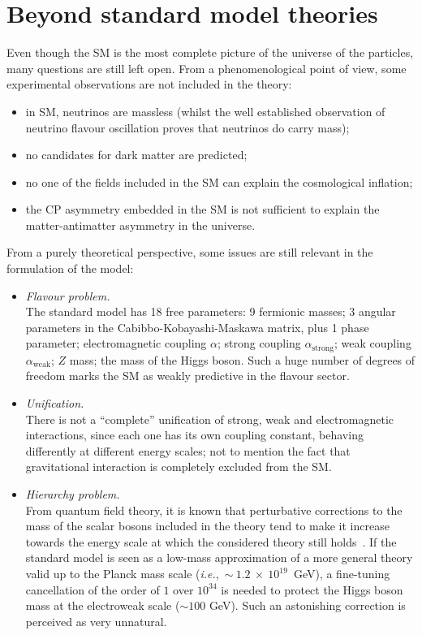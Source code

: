 \section{Beyond standard model theories}
Even though the SM is the most complete picture of the universe of the particles, many questions are still left open. From a phenomenological point of view, some experimental observations are not included in the theory:
\begin{itemize}
\item in SM, neutrinos are massless (whilst the well established observation of neutrino flavour oscillation proves that neutrinos do carry mass);
\item no candidates for dark matter are predicted;
\item no one of the fields included in the SM can explain the cosmological inflation;
\item the CP asymmetry embedded in the SM is not sufficient to explain the matter-antimatter asymmetry in the universe.
\end{itemize}
From a purely theoretical perspective, some issues are still relevant in the formulation of the model:
\begin{itemize}
\item {\itshape Flavour problem.}\\ The standard model has 18 free parameters: 9 fermionic masses; 3 angular parameters in the Cabibbo-Kobayashi-Maskawa matrix, plus 1 phase parameter; electromagnetic coupling $\alpha$; strong coupling $\alpha_{\text{strong}}$;  weak coupling $\alpha_{\text{weak}}$; $Z$ mass; the mass of the Higgs boson. Such a huge number of degrees of freedom marks the SM as weakly predictive in the flavour sector.
\item {\itshape Unification.}\\ There is not a ``complete'' unification of strong, weak and electromagnetic interactions, since each one has its own coupling constant, behaving differently at different energy scales; not to mention the fact that gravitational interaction is completely excluded from the SM.
\item {\itshape Hierarchy problem.}\\ From quantum field theory, it is known that perturbative corrections to the mass of the scalar bosons included in the theory tend to make it increase towards the energy scale at which the considered theory still holds~\cite{Degrassi:2012ry}. If the standard model is seen as a low-mass approximation of a more general theory valid up to the Planck mass scale (\textit{i.e.},~$\sim~1.2~\times~10^{19}$~GeV), a fine-tuning cancellation of the order of $1$ over $10^{34}$ is needed to protect the Higgs boson mass at the electroweak scale ($\sim 100$ GeV). Such an astonishing correction is perceived as very unnatural.
\end{itemize}

